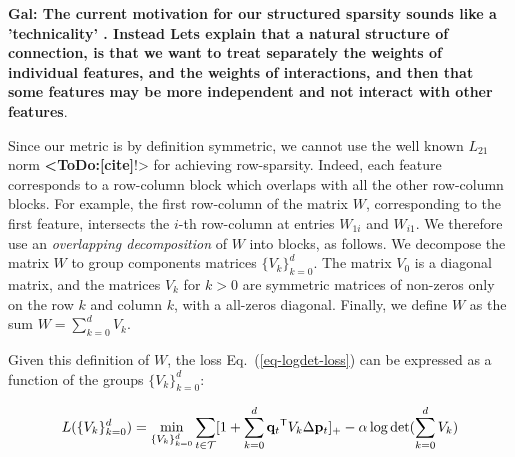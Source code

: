 \documentclass[twoside,11pt]{article}
\newcommand\todo[1]{\textbf{<ToDo:#1}!>}
\newcommand\mat[1]{{#1}}
\renewcommand\vec[1]{\mathbf{#1}}
\newcommand{\T}{{}^\mathsf{T}}
\newcommand{\W}{\mat{W}}
\newcommand{\q}{{\vec{q}}}
\newcommand{\trip}{{t}}
\newcommand{\qt}{{\q_{\trip}}}
\newcommand{\Vk}{\mat{V_k}}
\newcommand{\Vz}{\mat{V_0}}
\newcommand{\Vg}{\{\Vk\}_{k=0}^{d}} %
\renewcommand{\eqref}[1]{Eq.~(\ref{#1})}
\begin{document}
{\bf Gal: The current motivation  for our structured sparsity sounds like a 'technicality' . Instead Lets explain that a natural structure of connection, is that we want to treat separately the weights of individual features, and the weights of interactions, and then that some features may be more independent and not interact with other features}. 

Since our metric is by definition symmetric, we cannot use the well known $L_{21}$ norm \todo{[cite]} for achieving row-sparsity. Indeed, each feature corresponds to a row-column block which overlaps with all the other row-column blocks. For example, the first row-column of the matrix $\W$, corresponding to the first feature, intersects the $i$-th row-column at entries $W_{1i}$ and $W_{i1}$. We therefore use an \emph{overlapping decomposition} \citep{jacob2009group,obozinski2011group} of $W$ into blocks, as follows. 
We decompose the matrix $\W$ to group components matrices $\Vg$. The matrix $V_0$ is a diagonal matrix, and the matrices $V_k$ for $k>0$ are symmetric matrices of non-zeros only on the row $k$ and column $k$, with a all-zeros diagonal. Finally, we define $\W$ as the sum $\W = \sum_{k=0}^{d}{\Vk}$.





Given this definition of $\W$, the loss \eqref{eq-logdet-loss} can be expressed as a function of the groups $\Vg$:

\begin{equation}
L(\Vg) = 
  \min_{\Vg} \sum_{\trip \in \cal{T}}  [1+\sum_{k=0}^{d}{\qt\T \Vk\Delta \vec{p}_t } ]_{+} - \alpha \log \det(\sum_{k=0}^{d}{\Vk})
  \label{group_loss}
\end{equation} 
\end{document}
